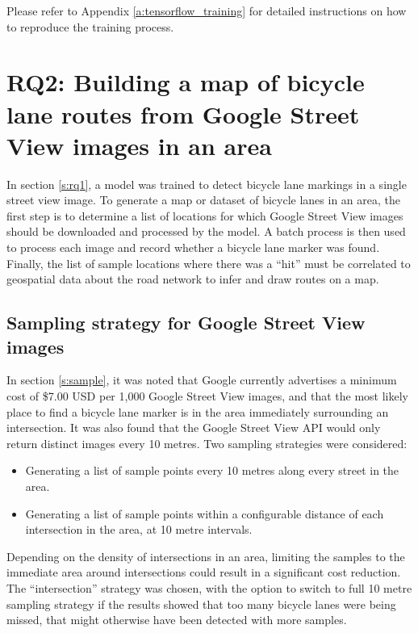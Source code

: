\documentclass[11pt,twoside]{report}
\begin{document}
Please refer to Appendix \ref{a:tensorflow_training} for detailed instructions on how to reproduce the training process.

\section{RQ2: Building a map of bicycle lane routes from Google Street View images in an area}
\label{s:rq2}

In section \ref{s:rq1}, a model was trained to detect bicycle lane markings in a single street view image.  To generate a map or dataset of bicycle lanes in an area, the first step is to determine a list of locations for which Google Street View images should be downloaded and processed by the model.  A batch process is then used to process each image and record whether a bicycle lane marker was found.  Finally, the list of sample locations where there was a ``hit'' must be correlated to geospatial data about the road network to infer and draw routes on a map.

\subsection{Sampling strategy for Google Street View images}
\label{s:rq2a}

In section \ref{s:sample}, it was noted that Google currently advertises a minimum cost of \$7.00 USD per 1,000 Google Street View images, and that the most likely place to find a bicycle lane marker is in the area immediately surrounding an intersection.  It was also found that the Google Street View API would only return distinct images every 10 metres.  Two sampling strategies were considered:
\begin{itemize}
\item{Generating a list of sample points every 10 metres along every street in the area.}
\item{Generating a list of sample points within a configurable distance of each intersection in the area, at 10 metre intervals.	}
\end{itemize}

Depending on the density of intersections in an area, limiting the samples to the immediate area around intersections could result in a significant cost reduction.  The ``intersection'' strategy was chosen, with the option to switch to full 10 metre sampling strategy if the results showed that too many bicycle lanes were being missed, that might otherwise have been detected with more samples.
\end{document}

